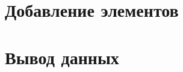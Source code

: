 \documentclass[12pt, a4paper]{article}
\begin{document}
\newpage
\section{Добавление элементов}

























\newpage
\section{Вывод данных}















\end{document}
